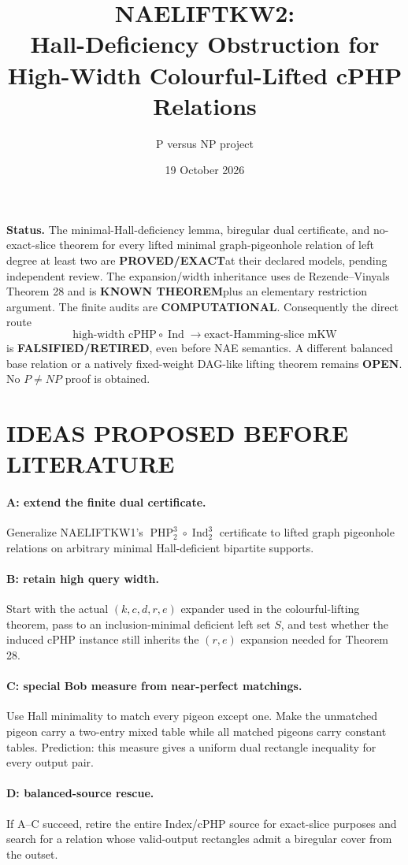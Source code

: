 \documentclass[11pt]{article}
\title{NAELIFTKW2:\\Hall-Deficiency Obstruction for High-Width Colourful-Lifted cPHP Relations}
\author{P versus NP project}
\date{19 October 2026}
\newcommand{\EXACT}{\textbf{PROVED/EXACT}}
\newcommand{\KNOWN}{\textbf{KNOWN THEOREM}}
\newcommand{\COMP}{\textbf{COMPUTATIONAL}}
\newcommand{\OPEN}{\textbf{OPEN}}
\newcommand{\RET}{\textbf{FALSIFIED/RETIRED}}
\begin{document}
\maketitle

\noindent\textbf{Status.}
The minimal-Hall-deficiency lemma, biregular dual certificate, and no-exact-slice theorem for every lifted minimal graph-pigeonhole relation of left degree at least two are \EXACT at their declared models, pending independent review. The expansion/width inheritance uses de Rezende--Vinyals Theorem 28 and is \KNOWN plus an elementary restriction argument. The finite audits are \COMP. Consequently the direct route
\[
\text{high-width cPHP}\circ\operatorname{Ind}
\longrightarrow
\text{exact-Hamming-slice mKW}
\]
is \RET, even before NAE semantics. A different balanced base relation or a natively fixed-weight DAG-like lifting theorem remains \OPEN. No $P\ne NP$ proof is obtained.

\section{IDEAS PROPOSED BEFORE LITERATURE}
\paragraph{A: extend the finite dual certificate.}
Generalize NAELIFTKW1's $\operatorname{PHP}_2^3\circ\operatorname{Ind}_2^3$ certificate to lifted graph pigeonhole relations on arbitrary minimal Hall-deficient bipartite supports.

\paragraph{B: retain high query width.}
Start with the actual $(k,c,d,r,e)$ expander used in the colourful-lifting theorem, pass to an inclusion-minimal deficient left set $S$, and test whether the induced cPHP instance still inherits the $(r,e)$ expansion needed for Theorem 28.

\paragraph{C: special Bob measure from near-perfect matchings.}
Use Hall minimality to match every pigeon except one. Make the unmatched pigeon carry a two-entry mixed table while all matched pigeons carry constant tables. Prediction: this measure gives a uniform dual rectangle inequality for every output pair.

\paragraph{D: balanced-source rescue.}
If A--C succeed, retire the entire Index/cPHP source for exact-slice purposes and search for a relation whose valid-output rectangles admit a biregular cover from the outset.
\end{document}

